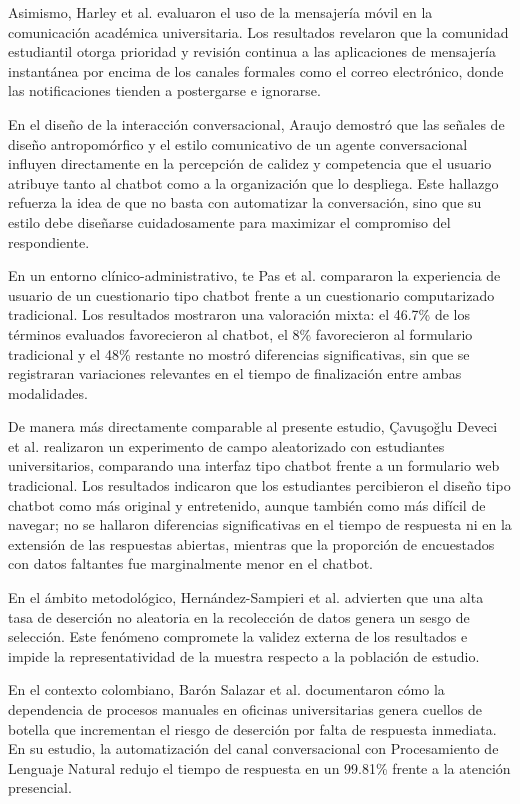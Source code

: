 \documentclass[12pt,letterpaper]{article}
\begin{document}
Asimismo, Harley et al. \cite{harley2007} evaluaron el uso de la mensajería móvil en la comunicación académica universitaria. Los resultados revelaron que la comunidad estudiantil otorga prioridad y revisión continua a las aplicaciones de mensajería instantánea por encima de los canales formales como el correo electrónico, donde las notificaciones tienden a postergarse e ignorarse.

En el diseño de la interacción conversacional, Araujo \cite{araujo2018} demostró que las señales de diseño antropomórfico y el estilo comunicativo de un agente conversacional influyen directamente en la percepción de calidez y competencia que el usuario atribuye tanto al chatbot como a la organización que lo despliega. Este hallazgo refuerza la idea de que no basta con automatizar la conversación, sino que su estilo debe diseñarse cuidadosamente para maximizar el compromiso del respondiente.

En un entorno clínico-administrativo, te Pas et al. \cite{tepas2020} compararon la experiencia de usuario de un cuestionario tipo chatbot frente a un cuestionario computarizado tradicional. Los resultados mostraron una valoración mixta: el 46.7\% de los términos evaluados favorecieron al chatbot, el 8\% favorecieron al formulario tradicional y el 48\% restante no mostró diferencias significativas, sin que se registraran variaciones relevantes en el tiempo de finalización entre ambas modalidades.

De manera más directamente comparable al presente estudio, Çavuşoğlu Deveci et al. \cite{devecifuchs2026} realizaron un experimento de campo aleatorizado con estudiantes universitarios, comparando una interfaz tipo chatbot frente a un formulario web tradicional. Los resultados indicaron que los estudiantes percibieron el diseño tipo chatbot como más original y entretenido, aunque también como más difícil de navegar; no se hallaron diferencias significativas en el tiempo de respuesta ni en la extensión de las respuestas abiertas, mientras que la proporción de encuestados con datos faltantes fue marginalmente menor en el chatbot.

En el ámbito metodológico, Hernández-Sampieri et al. \cite{hernandez2014} advierten que una alta tasa de deserción no aleatoria en la recolección de datos genera un sesgo de selección. Este fenómeno compromete la validez externa de los resultados e impide la representatividad de la muestra respecto a la población de estudio.

En el contexto colombiano, Barón Salazar et al. \cite{baronsalazar2026} documentaron cómo la dependencia de procesos manuales en oficinas universitarias genera cuellos de botella que incrementan el riesgo de deserción por falta de respuesta inmediata. En su estudio, la automatización del canal conversacional con Procesamiento de Lenguaje Natural redujo el tiempo de respuesta en un 99.81\% frente a la atención presencial.
\end{document}
